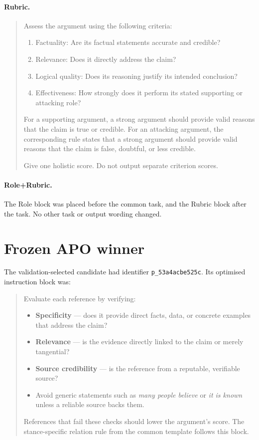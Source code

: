 \documentclass[11pt,twoside,a4paper]{report}
\begin{document}
\paragraph{Rubric.}
\begin{quote}\small
Assess the argument using the following criteria:
\begin{enumerate}
  \item Factuality: Are its factual statements accurate and credible?
  \item Relevance: Does it directly address the claim?
  \item Logical quality: Does its reasoning justify its intended conclusion?
  \item Effectiveness: How strongly does it perform its stated supporting or
        attacking role?
\end{enumerate}
For a supporting argument, a strong argument should provide valid reasons that
the claim is true or credible.  For an attacking argument, the corresponding
rule states that a strong argument should provide valid reasons that the claim
is false, doubtful, or less credible.

Give one holistic score. Do not output separate criterion scores.
\end{quote}

\paragraph{Role+Rubric.}
The Role block was placed before the common task, and the Rubric block after the
task.  No other task or output wording changed.

\section{Frozen APO winner}

The validation-selected candidate had identifier
\texttt{p\_53a4acbe525c}.  Its optimised instruction block was:

\begin{quote}\small
Evaluate each reference by verifying:
\begin{itemize}
  \item \textbf{Specificity} --- does it provide direct facts, data, or
        concrete examples that address the claim?
  \item \textbf{Relevance} --- is the evidence directly linked to the claim or
        merely tangential?
  \item \textbf{Source credibility} --- is the reference from a reputable,
        verifiable source?
  \item Avoid generic statements such as \emph{many people believe} or
        \emph{it is known} unless a reliable source backs them.
\end{itemize}
References that fail these checks should lower the argument's score.  The
stance-specific relation rule from the common template follows this block.
\end{quote}
\end{document}
